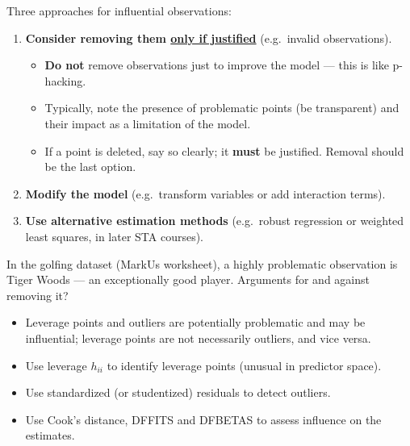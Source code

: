\begin{remark}
    Three approaches for influential observations:
    \begin{enumerate}
        \item \textbf{Consider removing them \underline{only if justified}} (e.g.\ invalid observations).
        \begin{itemize}
            \item \textbf{Do not} remove observations just to improve the model --- this is like p-hacking.
            \item Typically, note the presence of problematic points (be transparent) and their
            impact as a limitation of the model.
            \item If a point is deleted, say so clearly; it \textbf{must} be justified. Removal
            should be the last option.
        \end{itemize}
        \item \textbf{Modify the model} (e.g.\ transform variables or add interaction terms).
        \item \textbf{Use alternative estimation methods} (e.g.\ robust regression or weighted
        least squares, in later STA courses).
    \end{enumerate}
\end{remark}

\begin{example}
    In the golfing dataset (MarkUs worksheet), a highly problematic observation is Tiger Woods
    --- an exceptionally good player. Arguments for and against removing it?
    \\
\end{example}

\begin{remark}[Summary]
    \begin{itemize}
        \item Leverage points and outliers are potentially problematic and may be influential;
        leverage points are not necessarily outliers, and vice versa.
        \item Use leverage $h_{ii}$ to identify leverage points (unusual in predictor space).
        \item Use standardized (or studentized) residuals to detect outliers.
        \item Use Cook's distance, DFFITS and DFBETAS to assess influence on the estimates.
    \end{itemize}
\end{remark}
